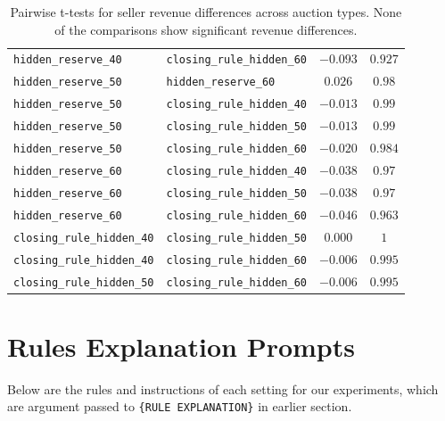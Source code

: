 \documentclass{article} %
\begin{document}
\begin{table}
\begin{tabular}{l l c c}
            \texttt{hidden\_reserve\_40} & \texttt{closing\_rule\_hidden\_60} & \(-0.093\) & \(0.927\) \\
            \texttt{hidden\_reserve\_50} & \texttt{hidden\_reserve\_60} & \(0.026\) & \(0.98\) \\
            \texttt{hidden\_reserve\_50} & \texttt{closing\_rule\_hidden\_40} & \(-0.013\) & \(0.99\) \\
            \texttt{hidden\_reserve\_50} & \texttt{closing\_rule\_hidden\_50} & \(-0.013\) & \(0.99\) \\
            \texttt{hidden\_reserve\_50} & \texttt{closing\_rule\_hidden\_60} & \(-0.020\) & \(0.984\) \\
            \texttt{hidden\_reserve\_60} & \texttt{closing\_rule\_hidden\_40} & \(-0.038\) & \(0.97\) \\
            \texttt{hidden\_reserve\_60} & \texttt{closing\_rule\_hidden\_50} & \(-0.038\) & \(0.97\) \\
            \texttt{hidden\_reserve\_60} & \texttt{closing\_rule\_hidden\_60} & \(-0.046\) & \(0.963\) \\
            \texttt{closing\_rule\_hidden\_40} & \texttt{closing\_rule\_hidden\_50} & \(0.000\) & \(1\) \\
            \texttt{closing\_rule\_hidden\_40} & \texttt{closing\_rule\_hidden\_60} & \(-0.006\) & \(0.995\) \\
            \texttt{closing\_rule\_hidden\_50} & \texttt{closing\_rule\_hidden\_60} & \(-0.006\) & \(0.995\) \\
            \bottomrule
        \end{tabular}
            \caption{Pairwise t-tests for seller revenue differences across auction types. None of the comparisons show significant revenue differences.       \label{tab:revenue_tests}}
    \end{table}

\section{Rules Explanation Prompts}\label{app:prompt}

Below are the rules and instructions of each setting for our experiments, which are argument passed to \texttt{\{RULE EXPLANATION\}} in earlier section.
\end{document}
